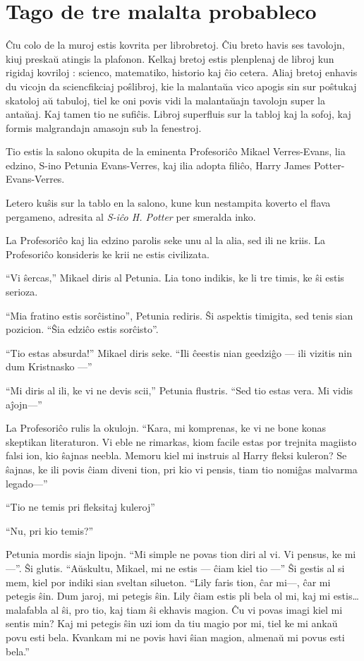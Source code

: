 \chapter{Tago de tre malalta probableco}

\lettrine{Ĉ}iu colo de la muroj estis kovrita per librobretoj. Ĉiu breto havis
ses tavolojn, kiuj preskaŭ atingis la plafonon. Kelkaj bretoj estis plenplenaj
de libroj kun rigidaj kovriloj : scienco, matematiko, historio kaj ĉio cetera.
Aliaj bretoj enhavis du vicojn da sciencfikciaj poŝlibroj, kie la malantaŭa vico
apogis sin sur poŝtukaj skatoloj aŭ tabuloj, tiel ke oni povis vidi la
malantaŭajn tavolojn super la antaŭaj. Kaj tamen tio ne sufiĉis. Libroj
superfluis sur la tabloj kaj la sofoj, kaj formis malgrandajn amasojn sub la
fenestroj.

Tio estis la salono okupita de la eminenta Profesoriĉo Mikael Verres-Evans, lia
edzino, S-ino Petunia Evans-Verres, kaj ilia adopta filiĉo, Harry James
Potter-Evans-Verres.

Letero kuŝis sur la tablo en la salono, kune kun nestampita koverto el flava
pergameno, adresita al \emph{S-iĉo H. Potter} per smeralda inko.

La Profesoriĉo kaj lia edzino parolis seke unu al la alia, sed ili ne kriis. La
Profesoriĉo konsideris ke krii ne estis civilizata.

``Vi ŝercas,'' Mikael diris al Petunia. Lia tono indikis, ke li tre timis, ke ŝi
estis serioza.

``Mia fratino estis sorĉistino'', Petunia rediris. Ŝi aspektis timigita, sed
tenis sian pozicion. ``Ŝia edziĉo estis sorĉisto''.

``Tio estas absurda!'' Mikael diris seke. ``Ili ĉeestis nian geedziĝo — ili
vizitis nin dum Kristnasko —''

``Mi diris al ili, ke vi ne devis scii,'' Petunia flustris. ``Sed tio estas
vera. Mi vidis aĵojn—''

La Profesoriĉo rulis la okulojn. ``Kara, mi komprenas, ke vi ne bone konas
skeptikan literaturon. Vi eble ne rimarkas, kiom facile estas por trejnita
magiisto falsi ion, kio ŝajnas neebla. Memoru kiel mi instruis al Harry fleksi
kuleron? Se ŝajnas, ke ili povis ĉiam diveni tion, pri kio vi pensis, tiam tio
nomiĝas malvarma legado—''

``Tio ne temis pri fleksitaj kuleroj''

``Nu, pri kio temis?''

Petunia mordis siajn lipojn. ``Mi simple ne povas tion diri al vi. Vi pensus, ke
mi —''. Ŝi glutis. ``Aŭskultu, Mikael, mi ne estis — ĉiam kiel tio —'' Ŝi gestis
al si mem, kiel por indiki sian sveltan silueton. ``Lily faris tion, ĉar mi—,
ĉar mi petegis ŝin. Dum jaroj, mi petegis ŝin. Lily ĉiam estis pli bela ol mi,
kaj mi estis\ldots{} malafabla al ŝi, pro tio, kaj tiam ŝi ekhavis magion. Ĉu vi
povas imagi kiel mi sentis min? Kaj mi petegis ŝin uzi iom da tiu magio por mi,
tiel ke mi ankaŭ povu esti bela. Kvankam mi ne povis havi ŝian magion, almenaŭ
mi povus esti bela.''

